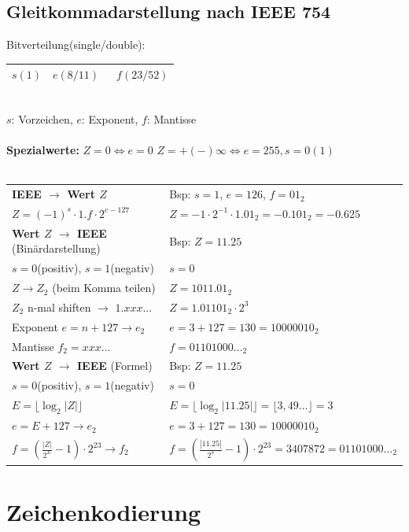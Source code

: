 \documentclass[6pt,a4paper]{scrartcl}
\newcommand{\abs}[1]{\ensuremath{\left\vert#1\right\vert}} 							%
\begin{document}
\begin{multicols*}{3}
	\subsection{Gleitkommadarstellung nach IEEE 754}
	Bitverteilung(single/double):\\
	\begin{tabular}{|c|c|c|} \hline 
		$s(1)$ & \quad $e(8/11)$ \quad\qquad & \qquad\qquad\qquad\ $f(23/52)$ \qquad\qquad\qquad\qquad \\ \hline
	\end{tabular} \\[0.5em]
	$s$: Vorzeichen, $e$: Exponent, $f$: Mantisse \\ \\
	\textbf{Spezialwerte:} $Z = 0 \Leftrightarrow e=0$ \qquad $Z = + (-)\infty \Leftrightarrow e=255, s=0(1)$ \\ \\
	\begin{tabular}{l|p{4.5cm}}
		\textbf{IEEE $\rightarrow$ Wert $Z$} & Bsp: $s = 1$, $e = 126$, $f = 01_2$\\		
		$Z = (-1)^s \cdot  1.f \cdot 2^{e-127}$ & $Z=-1 \cdot 2^{-1} \cdot 1.01_2 = -0.101_2= -0.625$ \\ \midrule
		\textbf{Wert $Z$ $\rightarrow$ IEEE} (Binärdarstellung) & Bsp: $Z=11.25$ \\
		$s=0$(positiv), $s=1$(negativ) & $s=0$\\
		$Z \rightarrow Z_2$ (beim Komma teilen) & $Z = 1011.01_2$\\
		$Z_2$ n-mal shiften $\rightarrow$ $1.xxx\dots$ & $Z=1.01101_2\cdot 2^3$ \\
		Exponent $e=n+127 \rightarrow e_2$ & $e=3+127=130=10000010_2$\\
		Mantisse $f_2=xxx\dots$ & $f=01101000\dots_2$ \\ \midrule
		\textbf{Wert $Z$ $\rightarrow$ IEEE} (Formel) & Bsp: $Z=11.25$ \\
		$s=0$(positiv), $s=1$(negativ) & $s=0$\\
		$E=\lfloor \log_2\abs{Z}\rfloor$ & $E=\lfloor \log_2\abs{11.25}\rfloor=\lfloor3,49\dots\rfloor=3$\\
		$e=E+127 \rightarrow e_2$ & $e=3+127=130=10000010_2$\\
		$f=\left(\frac{\abs{Z}}{2^E}-1\right) \cdot 2^{23} \rightarrow f_2$  & $f=\left(\frac{\abs{11.25}}{2^3}-1\right)\cdot 2^{23}=3407872= 01101000\dots_2 $
	\end{tabular}
	
\section{Zeichenkodierung}

\end{multicols*}
\end{document}
